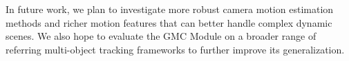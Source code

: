 \documentclass{article}
\begin{document}
In future work, we plan to investigate more robust camera motion estimation methods and richer motion features that can better handle complex dynamic scenes. We also hope to evaluate the GMC Module on a broader range of referring multi-object tracking frameworks to further improve its generalization.



\end{document}
